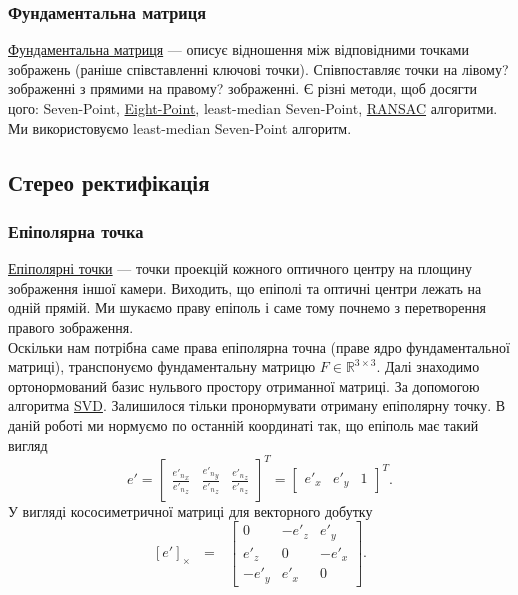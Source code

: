\subsubsection{Фундаментальна матриця}
\href{https://en.wikipedia.org/wiki/Fundamental_matrix_(computer_vision)}
{Фундаментальна матриця} --- описує відношення між відповідними точками 
зображень (раніше співставленні ключові точки). Співпоставляє точки на лівому? 
зображенні з прямими на правому? зображенні. Є різні методи, щоб досягти цого:
Seven-Point,
\href{https://en.wikipedia.org/wiki/Eight-point_algorithm}{Eight-Point},
least-median Seven-Point,
\href{https://en.wikipedia.org/wiki/Random_sample_consensus}{RANSAC} алгоритми.
Ми використовуємо least-median Seven-Point алгоритм.


\subsection{Стерео ректифікація}
\subsubsection{Епіполярна точка}
\href{https://en.wikipedia.org/wiki/Epipolar_geometry}
{Епіполярні точки} --- точки проекцій кожного оптичного центру на площину 
зображення іншої камери. Виходить, що епіполі та оптичні центри лежать на одній 
прямій. Ми шукаємо праву епіполь і саме тому почнемо з перетворення правого 
зображення. \\
Оскільки нам потрібна саме права епіполярна точна (праве ядро фундаментальної 
матриці), транспонуємо фундаментальну матрицю $F \in \mathbb{R}^{3\times3}$. 
Далі знаходимо ортонормований базис нульвого простору отриманної матриці. За 
допомогою алгоритма 
\href{https://en.wikipedia.org/wiki/Singular_value_decomposition}
{SVD}. Залишилося тільки пронормувати отриману епіполярну точку. В даній роботі
ми нормуємо по останній координаті так, що епіполь має такий вигляд 
\begin{equation}
e' = {
\begin{bmatrix}
\frac{{{e'}_n}_x}{{{e'}_n}_z} & \frac{{{e'}_n}_y}{{{e'}_n}_z} & 
\frac{{{e'}_n}_z}{{{e'}_n}_z}
\end{bmatrix}
}^T = {
\begin{bmatrix}
e'_x & e'_y & 1
\end{bmatrix}
}^T.
\end{equation}
У вигляді кососиметричної матриці для векторного добутку
\begin{equation}
{[e']}_\times \:\:\: = \:\:\:
\left[
\begin{matrix}
0 & -{e'}_z & {e'}_y\\
{e'}_z & 0 & -{e'}_x\\
-{e'}_y & {e'}_x & 0\
\end{matrix}
\right].
\end{equation}

